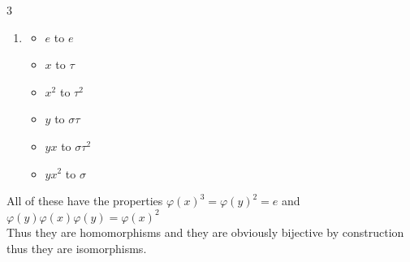 \documentclass[12pt, letterpaper]{article}
\theoremstyle{definition}
\begin{document}
\begin{multicols}{3}
\begin{enumerate}
\begin{itemize}
        \item $e$ to $e$
        \item $x$ to $\tau$
        \item $x^2$ to $\tau^2$
        \item $y$ to $\sigma\tau^2$
        \item $yx$ to $\sigma$
        \item $yx^2$ to $\sigma\tau$
        \end{itemize}
    \item \begin{itemize}
        \item $e$ to $e$
        \item $x$ to $\tau$
        \item $x^2$ to $\tau^2$
        \item $y$ to $\sigma\tau$
        \item $yx$ to $\sigma\tau^2$
        \item $yx^2$ to $\sigma$
        \end{itemize}
\end{enumerate}
\end{multicols}

All of these have the properties $\varphi(x)^3=\varphi(y)^2=e$ and $\varphi(y)\varphi(x)\varphi(y)=\varphi(x)^2$\\
Thus they are homomorphisms and they are obviously bijective by construction thus they are isomorphisms.


\newpage
\end{document}
